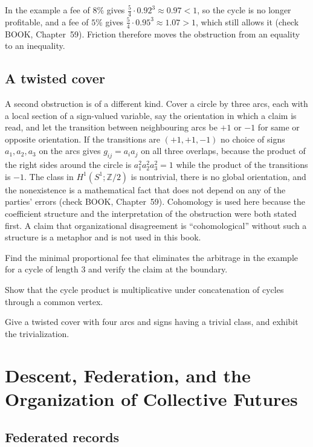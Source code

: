 In the example a fee of $8\%$ gives $\tfrac54\cdot0.92^3\approx0.97<1$, so the cycle is no longer profitable, and a fee of $5\%$ gives $\tfrac54\cdot0.95^3\approx1.07>1$, which still allows it (check BOOK, Chapter~59). Friction therefore moves the obstruction from an equality to an inequality.

\section{A twisted cover}

A second obstruction is of a different kind. Cover a circle by three arcs, each with a local section of a sign-valued variable, say the orientation in which a claim is read, and let the transition between neighbouring arcs be $+1$ or $-1$ for same or opposite orientation. If the transitions are $(+1,+1,-1)$ no choice of signs $a_1,a_2,a_3$ on the arcs gives $g_{ij}=a_ia_j$ on all three overlaps, because the product of the right sides around the circle is $a_1^2a_2^2a_3^2=1$ while the product of the transitions is $-1$. The class in $H^1(S^1;\mathbb Z/2)$ is nontrivial, there is no global orientation, and the nonexistence is a mathematical fact that does not depend on any of the parties' errors (check BOOK, Chapter~59). Cohomology is used here because the coefficient structure and the interpretation of the obstruction were both stated first. A claim that organizational disagreement is ``cohomological'' without such a structure is a metaphor and is not used in this book.

\begin{exercise}Find the minimal proportional fee that eliminates the arbitrage in the example for a cycle of length $3$ and verify the claim at the boundary.\end{exercise}
\begin{exercise}Show that the cycle product is multiplicative under concatenation of cycles through a common vertex.\end{exercise}
\begin{exercise}Give a twisted cover with four arcs and signs having a trivial class, and exhibit the trivialization.\end{exercise}

\chapter{Descent, Federation, and the Organization of Collective Futures}\label{ch:60}

\section{Federated records}

